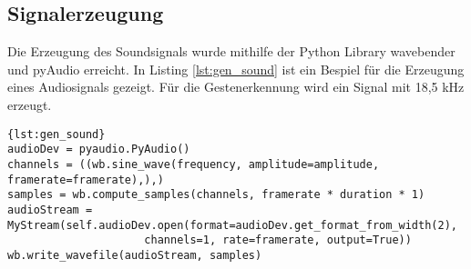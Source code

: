 \subsection{Signalerzeugung}
Die Erzeugung des Soundsignals wurde mithilfe der Python Library wavebender und
pyAudio erreicht. In Listing \ref{lst:gen_sound} ist ein Bespiel für die
Erzeugung eines Audiosignals gezeigt. Für die Gestenerkennung wird ein Signal
mit 18,5 kHz erzeugt.

\enlargethispage{\baselineskip}
\enlargethispage{\baselineskip}
\enlargethispage{\baselineskip}
\begin{lstlisting}[caption={Erzeugung eines Soundsignals},label={lst:gen_sound}]{lst:gen_sound} 
audioDev = pyaudio.PyAudio()
channels = ((wb.sine_wave(frequency, amplitude=amplitude, framerate=framerate),),)
samples = wb.compute_samples(channels, framerate * duration * 1)
audioStream = MyStream(self.audioDev.open(format=audioDev.get_format_from_width(2),
					 channels=1, rate=framerate, output=True))
wb.write_wavefile(audioStream, samples)
\end{lstlisting}


\nocite{Gupta2012}
